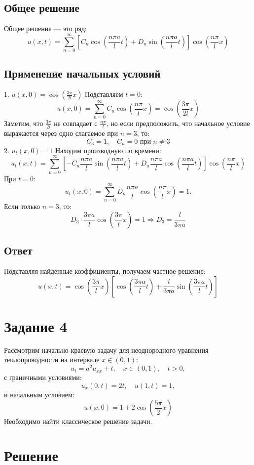 \documentclass{article}
\begin{document}
\subsection{Общее решение}
Общее решение — это ряд:
$$
u(x, t) = \sum_{n=0}^\infty \left[ C_n \cos\left(\frac{n\pi a}{l}t\right) + D_n \sin\left(\frac{n\pi a}{l}t\right) \right] \cos\left(\frac{n\pi}{l}x\right)
$$
\subsection{Применение начальных условий}
1. $ u(x, 0) = \cos\left(\frac{3\pi}{2l}x\right) $
Подставляем $ t = 0 $:
$$
u(x, 0) = \sum_{n=0}^\infty C_n \cos\left(\frac{n\pi}{l}x\right) = \cos\left(\frac{3\pi}{2l}x\right)
$$
Заметим, что $ \frac{3\pi}{2l} $ не совпадает с $ \frac{n\pi}{l} $, но если предположить, что начальное условие выражается через одно слагаемое при $ n = 3 $, то:
$$
C_3 = 1, \quad C_n = 0 \text{ при } n \neq 3
$$
2. $ u_t(x, 0) = 1 $
Находим производную по времени:
$$
u_t(x, t) = \sum_{n=0}^\infty \left[ -C_n \frac{n\pi a}{l} \sin\left(\frac{n\pi a}{l}t\right) + D_n \frac{n\pi a}{l} \cos\left(\frac{n\pi a}{l}t\right) \right] \cos\left(\frac{n\pi}{l}x\right)
$$
При $ t = 0 $:
$$
u_t(x, 0) = \sum_{n=0}^\infty D_n \frac{n\pi a}{l} \cos\left(\frac{n\pi}{l}x\right) = 1.
$$
Если только $ n = 3 $, то:
$$
D_3 \cdot \frac{3\pi a}{l} \cos\left(\frac{3\pi}{l}x\right) = 1 \Rightarrow D_3 = \frac{l}{3\pi a}
$$
\subsection{Ответ}
Подставляя найденные коэффициенты, получаем частное решение:
$$
\boxed{
u(x, t) = \cos\left(\frac{3\pi}{l}x\right) \left[ \cos\left(\frac{3\pi a}{l}t\right) + \frac{l}{3\pi a} \sin\left(\frac{3\pi a}{l}t\right) \right]
}
$$
\section*{Задание 4}
Рассмотрим начально-краевую задачу для неоднородного уравнения теплопроводности на интервале $ x \in (0, 1) $:
$$
u_t = a^2 u_{xx} + t, \quad x \in (0, 1), \quad t > 0,
$$
с граничными условиями:
$$
u_x(0, t) = 2t, \quad u(1, t) = 1,
$$
и начальным условием:
$$
u(x, 0) = 1 + 2\cos\left(\frac{5\pi}{2}x\right)
$$
Необходимо найти классическое решение задачи.
\section*{Решение}
\end{document}

